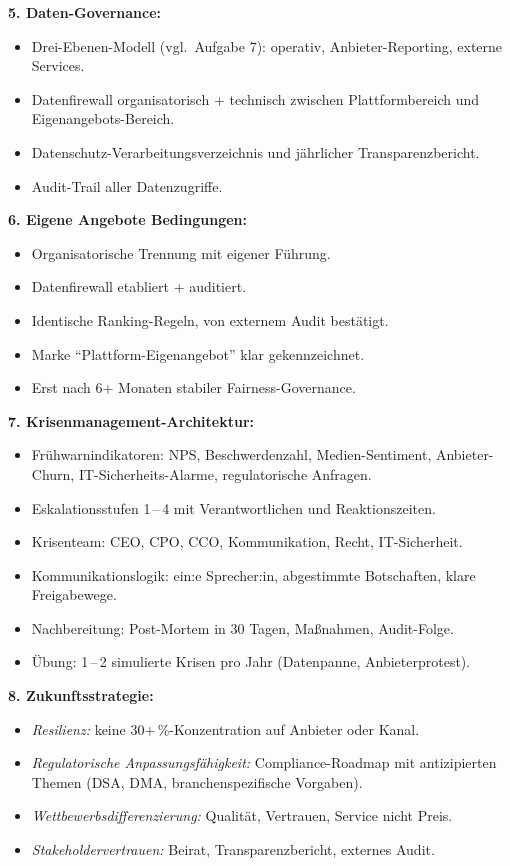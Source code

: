 \documentclass[11pt,a4paper,oneside]{article}
\begin{document}
\begin{loesungbox}
\textbf{5. Daten-Governance:}
\begin{itemize}
  \item Drei-Ebenen-Modell (vgl.\ Aufgabe 7): operativ, Anbieter-Reporting, externe Services.
  \item Datenfirewall organisatorisch + technisch zwischen Plattformbereich und Eigenangebots-Bereich.
  \item Datenschutz-Verarbeitungsverzeichnis und jährlicher Transparenzbericht.
  \item Audit-Trail aller Datenzugriffe.
\end{itemize}

\textbf{6. Eigene Angebote \textendash{} Bedingungen:}
\begin{itemize}
  \item Organisatorische Trennung mit eigener Führung.
  \item Datenfirewall etabliert + auditiert.
  \item Identische Ranking-Regeln, von externem Audit bestätigt.
  \item Marke ``Plattform-Eigenangebot'' klar gekennzeichnet.
  \item Erst nach 6+ Monaten stabiler Fairness-Governance.
\end{itemize}

\textbf{7. Krisenmanagement-Architektur:}
\begin{itemize}
  \item Frühwarnindikatoren: NPS, Beschwerdenzahl, Medien-Sentiment, Anbieter-Churn, IT-Sicherheits-Alarme, regulatorische Anfragen.
  \item Eskalationsstufen 1\,--\,4 mit Verantwortlichen und Reaktionszeiten.
  \item Krisenteam: CEO, CPO, CCO, Kommunikation, Recht, IT-Sicherheit.
  \item Kommunikationslogik: ein:e Sprecher:in, abgestimmte Botschaften, klare Freigabewege.
  \item Nachbereitung: Post-Mortem in 30 Tagen, Maßnahmen, Audit-Folge.
  \item Übung: 1\,--\,2 simulierte Krisen pro Jahr (Datenpanne, Anbieterprotest).
\end{itemize}

\textbf{8. Zukunftsstrategie:}
\begin{itemize}
  \item \emph{Resilienz:} keine 30+\,\%-Konzentration auf Anbieter oder Kanal.
  \item \emph{Regulatorische Anpassungsfähigkeit:} Compliance-Roadmap mit antizipierten Themen (DSA, DMA, branchenspezifische Vorgaben).
  \item \emph{Wettbewerbsdifferenzierung:} Qualität, Vertrauen, Service \textendash{} nicht Preis.
  \item \emph{Stakeholdervertrauen:} Beirat, Transparenzbericht, externes Audit.
\end{itemize}


\end{loesungbox}
\end{document}
